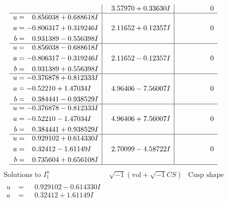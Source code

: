 \documentclass[1p]{elsarticle_modified}
\theoremstyle{definition}
\newcommand{\I}{\sqrt{-1}}
\begin{document}
$$\begin{array}{c|c|c}
 & \phantom{-}3.57970 + 0.33630 I & \phantom{-0.000000 } 0 \\ \hline\begin{aligned}
u &= \phantom{-}0.856038 + 0.688618 I \\
a &= -0.806317 + 0.319246 I \\
b &= \phantom{-}0.931389 - 0.556398 I\end{aligned}
 & \phantom{-}2.11652 + 0.12357 I & \phantom{-0.000000 } 0 \\ \hline\begin{aligned}
u &= \phantom{-}0.856038 - 0.688618 I \\
a &= -0.806317 - 0.319246 I \\
b &= \phantom{-}0.931389 + 0.556398 I\end{aligned}
 & \phantom{-}2.11652 - 0.12357 I & \phantom{-0.000000 } 0 \\ \hline\begin{aligned}
u &= -0.376878 + 0.812333 I \\
a &= -0.52210 + 1.47034 I \\
b &= \phantom{-}0.384441 - 0.938529 I\end{aligned}
 & \phantom{-}4.96406 - 7.56007 I & \phantom{-0.000000 } 0 \\ \hline\begin{aligned}
u &= -0.376878 - 0.812333 I \\
a &= -0.52210 - 1.47034 I \\
b &= \phantom{-}0.384441 + 0.938529 I\end{aligned}
 & \phantom{-}4.96406 + 7.56007 I & \phantom{-0.000000 } 0 \\ \hline\begin{aligned}
u &= \phantom{-}0.929102 + 0.614330 I \\
a &= \phantom{-}0.32412 - 1.61149 I \\
b &= \phantom{-}0.735604 + 0.656108 I\end{aligned}
 & \phantom{-}2.70099 - 4.58722 I & \phantom{-0.000000 } 0\\
 \hline 
 \end{array}$$\newpage$$\begin{array}{c|c|c}  
\text{Solutions to }I^u_{1}& \I (\text{vol} + \sqrt{-1}CS) & \text{Cusp shape}\\
 \hline 
\begin{aligned}
u &= \phantom{-}0.929102 - 0.614330 I \\
a &= \phantom{-}0.32412 + 1.61149 I \\

\end{aligned}
\end{array}$$
\end{document}
